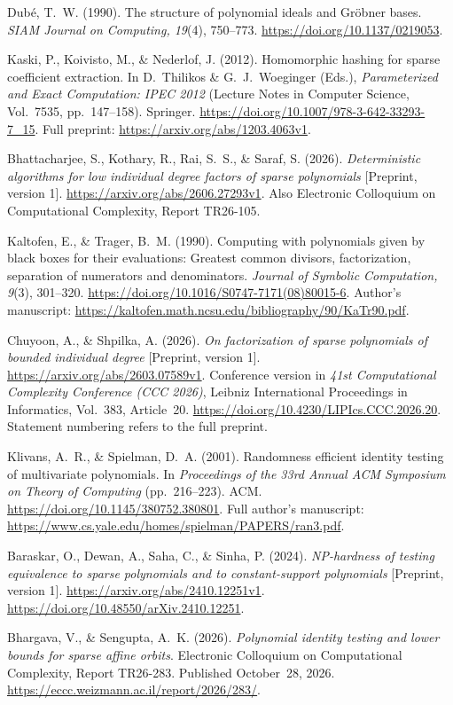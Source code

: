 Dub\'e, T.~W. (1990). The structure of polynomial ideals and Gr\"obner
bases. \emph{SIAM Journal on Computing, 19}(4), 750--773.
\url{https://doi.org/10.1137/0219053}.

Kaski, P., Koivisto, M., \& Nederlof, J. (2012).
Homomorphic hashing for sparse coefficient extraction.
In D.~Thilikos \& G.~J.~Woeginger (Eds.),
\emph{Parameterized and Exact Computation: IPEC 2012}
(Lecture Notes in Computer Science, Vol.~7535, pp.~147--158).
Springer. \url{https://doi.org/10.1007/978-3-642-33293-7_15}.
Full preprint: \url{https://arxiv.org/abs/1203.4063v1}.

Bhattacharjee, S., Kothary, R., Rai, S.~S., \& Saraf, S. (2026).
\emph{Deterministic algorithms for low individual degree factors of
sparse polynomials} [Preprint, version 1].
\url{https://arxiv.org/abs/2606.27293v1}.
Also Electronic Colloquium on Computational Complexity, Report TR26-105.

Kaltofen, E., \& Trager, B.~M. (1990).
Computing with polynomials given by black boxes for their evaluations:
Greatest common divisors, factorization, separation of numerators
and denominators. \emph{Journal of Symbolic Computation, 9}(3), 301--320.
\url{https://doi.org/10.1016/S0747-7171(08)80015-6}.
Author's manuscript:
\url{https://kaltofen.math.ncsu.edu/bibliography/90/KaTr90.pdf}.

Chuyoon, A., \& Shpilka, A. (2026).
\emph{On factorization of sparse polynomials of bounded individual degree}
[Preprint, version 1]. \url{https://arxiv.org/abs/2603.07589v1}.
Conference version in \emph{41st Computational Complexity Conference
(CCC 2026)}, Leibniz International Proceedings in Informatics,
Vol.~383, Article~20.
\url{https://doi.org/10.4230/LIPIcs.CCC.2026.20}.
Statement numbering refers to the full preprint.

Klivans, A.~R., \& Spielman, D.~A. (2001).
Randomness efficient identity testing of multivariate polynomials.
In \emph{Proceedings of the 33rd Annual ACM Symposium on Theory
of Computing} (pp.~216--223). ACM.
\url{https://doi.org/10.1145/380752.380801}.
Full author's manuscript:
\url{https://www.cs.yale.edu/homes/spielman/PAPERS/ran3.pdf}.

Baraskar, O., Dewan, A., Saha, C., \& Sinha, P. (2024).
\emph{NP-hardness of testing equivalence to sparse polynomials
and to constant-support polynomials} [Preprint, version 1].
\url{https://arxiv.org/abs/2410.12251v1}.
\url{https://doi.org/10.48550/arXiv.2410.12251}.

Bhargava, V., \& Sengupta, A.~K. (2026).
\emph{Polynomial identity testing and lower bounds for sparse affine
orbits}. Electronic Colloquium on Computational Complexity,
Report TR26-283. Published October~28, 2026.
\url{https://eccc.weizmann.ac.il/report/2026/283/}.
